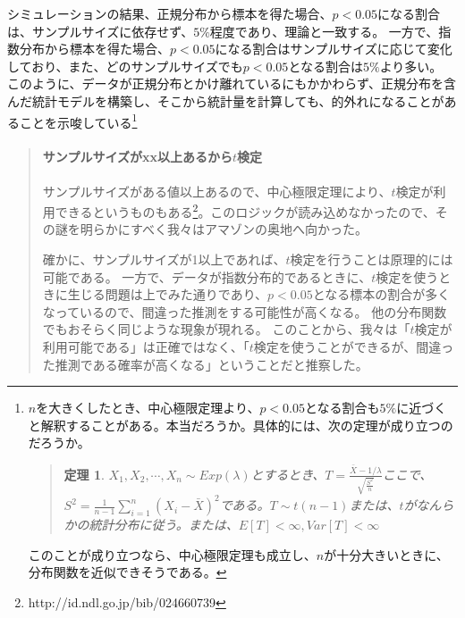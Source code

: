 \documentclass[a4paper,11pt,dvipdfmx]{jsarticle}
\newtheorem{theo}{定理}[section]
\begin{document}
シミュレーションの結果、正規分布から標本を得た場合、$p<0.05$になる割合は、サンプルサイズに依存せず、$5\%$程度であり、理論と一致する。
一方で、指数分布から標本を得た場合、$p<0.05$になる割合はサンプルサイズに応じて変化しており、また、どのサンプルサイズでも$p<0.05$となる割合は$5\%$より多い。
このように、データが正規分布とかけ離れているにもかかわらず、正規分布を含んだ統計モデルを構築し、そこから統計量を計算しても、的外れになることがあることを示唆している\footnote{$n$を大きくしたとき、中心極限定理より、$p<0.05$となる割合も$5\%$に近づくと解釈することがある。本当だろうか。具体的には、次の定理が成り立つのだろうか。
\begin{quote}
\begin{theo}
    $X_1,X_2,\cdots,X_n \sim Exp(\lambda)$とするとき、$T=\frac{\bar{X}-1/\lambda}{\sqrt{\frac{S^2}{n}}}$ここで、$S^2=\frac{1}{n-1}\sum_{i=1}^n(X_i-\bar{X})^2$である。$T\sim t(n-1)$または、$t$がなんらかの統計分布に従う。または、$E[T]<\infty,Var[T]<\infty$
\end{theo}
\end{quote}
このことが成り立つなら、中心極限定理も成立し、$n$が十分大きいときに、分布関数を近似できそうである。
}
\fi
\begin{mybox}
    \begin{quote}
        \paragraph{サンプルサイズがxx以上あるから$t$検定}
        サンプルサイズがある値以上あるので、中心極限定理により、$t$検定が利用できるというものもある\footnote{http://id.ndl.go.jp/bib/024660739}。このロジックが読み込めなかったので、その謎を明らかにすべく我々はアマゾンの奥地へ向かった。

        確かに、サンプルサイズが1以上であれば、$t$検定を行うことは原理的には可能である。
        一方で、データが指数分布的であるときに、$t$検定を使うときに生じる問題は上でみた通りであり、$p<0.05$となる標本の割合が多くなっているので、間違った推測をする可能性が高くなる。
        他の分布関数でもおそらく同じような現象が現れる。
        このことから、我々は「$t$検定が利用可能である」は正確ではなく、「$t$検定を使うことができるが、間違った推測である確率が高くなる」ということだと推察した。
    \end{quote}
\end{mybox}
\end{document}
